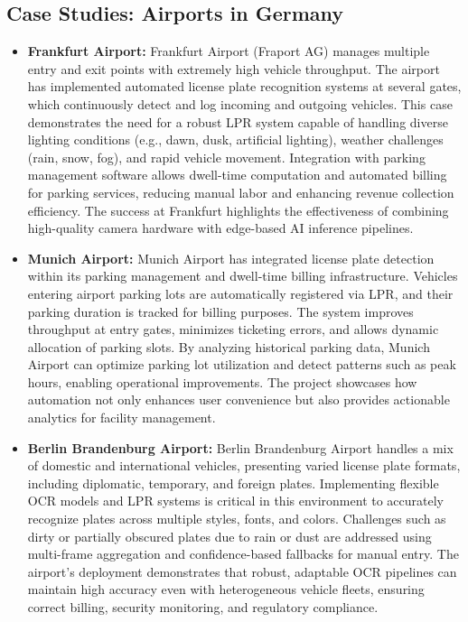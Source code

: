 	\subsection{Case Studies: Airports in Germany}
	\begin{itemize}
		\item \textbf{Frankfurt Airport:} Frankfurt Airport (Fraport AG) manages multiple entry and exit points with extremely high vehicle throughput. The airport has implemented automated license plate recognition systems at several gates, which continuously detect and log incoming and outgoing vehicles. This case demonstrates the need for a robust LPR system capable of handling diverse lighting conditions (e.g., dawn, dusk, artificial lighting), weather challenges (rain, snow, fog), and rapid vehicle movement. Integration with parking management software allows dwell-time computation and automated billing for parking services, reducing manual labor and enhancing revenue collection efficiency. The success at Frankfurt highlights the effectiveness of combining high-quality camera hardware with edge-based AI inference pipelines.
		
		\item \textbf{Munich Airport:} Munich Airport has integrated license plate detection within its parking management and dwell-time billing infrastructure. Vehicles entering airport parking lots are automatically registered via LPR, and their parking duration is tracked for billing purposes. The system improves throughput at entry gates, minimizes ticketing errors, and allows dynamic allocation of parking slots. By analyzing historical parking data, Munich Airport can optimize parking lot utilization and detect patterns such as peak hours, enabling operational improvements. The project showcases how automation not only enhances user convenience but also provides actionable analytics for facility management.
		
		\item \textbf{Berlin Brandenburg Airport:} Berlin Brandenburg Airport handles a mix of domestic and international vehicles, presenting varied license plate formats, including diplomatic, temporary, and foreign plates. Implementing flexible OCR models and LPR systems is critical in this environment to accurately recognize plates across multiple styles, fonts, and colors. Challenges such as dirty or partially obscured plates due to rain or dust are addressed using multi-frame aggregation and confidence-based fallbacks for manual entry. The airport's deployment demonstrates that robust, adaptable OCR pipelines can maintain high accuracy even with heterogeneous vehicle fleets, ensuring correct billing, security monitoring, and regulatory compliance.
		

\end{itemize}
